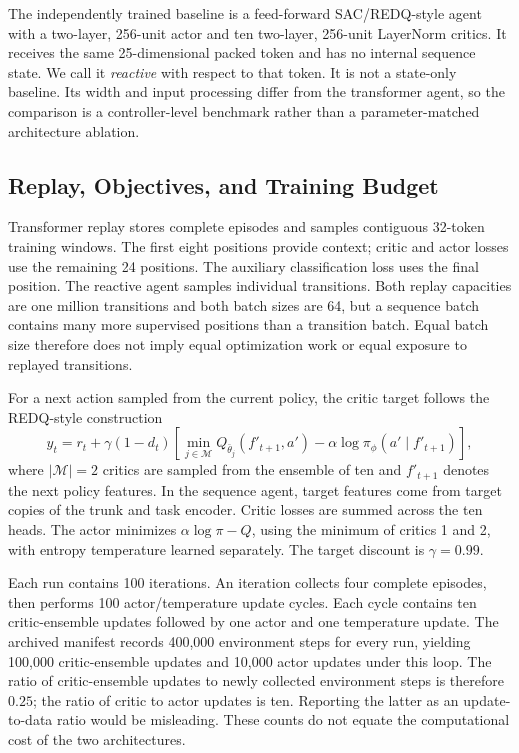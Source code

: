 \documentclass[runningheads]{llncs}
\begin{document}
The independently trained baseline is a feed-forward SAC/REDQ-style agent with a two-layer, 256-unit actor and ten two-layer, 256-unit LayerNorm critics. It receives the same 25-dimensional packed token and has no internal sequence state. We call it \emph{reactive} with respect to that token. It is not a state-only baseline. Its width and input processing differ from the transformer agent, so the comparison is a controller-level benchmark rather than a parameter-matched architecture ablation.

\subsection{Replay, Objectives, and Training Budget}
Transformer replay stores complete episodes and samples contiguous 32-token training windows. The first eight positions provide context; critic and actor losses use the remaining 24 positions. The auxiliary classification loss uses the final position. The reactive agent samples individual transitions. Both replay capacities are one million transitions and both batch sizes are 64, but a sequence batch contains many more supervised positions than a transition batch. Equal batch size therefore does not imply equal optimization work or equal exposure to replayed transitions.

For a next action sampled from the current policy, the critic target follows the REDQ-style construction
\begin{equation}
 y_t = r_t + \gamma(1-d_t)
 \left[\min_{j\in\mathcal{M}} Q_{\bar\theta_j}(f'_{t+1},a')
       -\alpha\log\pi_\phi(a'\mid f'_{t+1})\right],
 \label{eq:target}
\end{equation}
where $|\mathcal{M}|=2$ critics are sampled from the ensemble of ten and $f'_{t+1}$ denotes the next policy features. In the sequence agent, target features come from target copies of the trunk and task encoder. Critic losses are summed across the ten heads. The actor minimizes $\alpha\log\pi-Q$, using the minimum of critics 1 and 2, with entropy temperature learned separately. The target discount is $\gamma=0.99$.

Each run contains 100 iterations. An iteration collects four complete episodes, then performs 100 actor/temperature update cycles. Each cycle contains ten critic-ensemble updates followed by one actor and one temperature update. The archived manifest records 400,000 environment steps for every run, yielding 100,000 critic-ensemble updates and 10,000 actor updates under this loop. The ratio of critic-ensemble updates to newly collected environment steps is therefore $0.25$; the ratio of critic to actor updates is ten. Reporting the latter as an update-to-data ratio would be misleading. These counts do not equate the computational cost of the two architectures.
\end{document}
